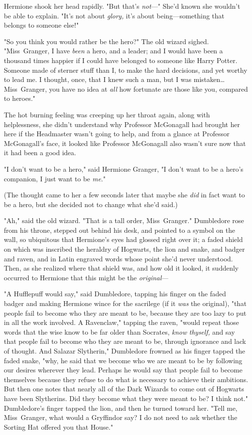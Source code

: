 Hermione shook her head rapidly. "But that's \emph{not}---" She'd known she
wouldn't be able to explain. "It's not about \emph{glory,} it's about
being---something that belongs to someone else!"

"So you think you would rather be the hero?" The old wizard sighed.
"Miss~Granger, I have \emph{been} a hero, and a leader; and I would have been a
thousand times happier if I could have belonged to someone like Harry Potter.
Someone made of sterner stuff than I, to make the hard decisions, and yet
worthy to lead me. I thought, once, that I knew such a man, but I was
mistaken{\ldots} Miss~Granger, you have no idea at \emph{all} how fortunate are
those like you, compared to heroes."

The hot burning feeling was creeping up her throat again, along with
helplessness, she didn't understand why Professor McGonagall had brought her
here if the Headmaster wasn't going to help, and from a glance at Professor
McGonagall's face, it looked like Professor McGonagall also wasn't sure now
that it had been a good idea.

"I don't want to be a hero," said Hermione Granger, "I don't want to be a
hero's companion, I just want to be \emph{me.}"

(The thought came to her a few seconds later that maybe she \emph{did} in fact
want to be a hero, but she decided not to change what she'd said.)

"Ah," said the old wizard. "That is a tall order, Miss~Granger." Dumbledore
rose from his throne, stepped out behind his desk, and pointed to a symbol on
the wall, so ubiquitous that Hermione's eyes had glossed right over it; a faded
shield on which was inscribed the heraldry of Hogwarts, the lion and snake, and
badger and raven, and in Latin engraved words whose point she'd never
understood. Then, as she realized where that shield was, and how old it looked,
it suddenly occurred to Hermione that this might be the \emph{original}---

"A Hufflepuff would say," said Dumbledore, tapping his finger on the faded
badger and making Hermione wince for the sacrilege (if it \emph{was} the
original), "that people fail to become who they are meant to be, because they
are too lazy to put in all the work involved. A Ravenclaw," tapping the raven,
"would repeat those words that the wise know to be far older than Socrates,
\emph{know thyself,} and say that people fail to become who they are meant to
be, through ignorance and lack of thought. And Salazar Slytherin," Dumbledore
frowned as his finger tapped the faded snake, "why, he said that we become who
we are meant to be by following our desires wherever they lead. Perhaps he
would say that people fail to become themselves because they refuse to do what
is necessary to achieve their ambitions. But then one notes that nearly all of
the Dark Wizards to come out of Hogwarts have been Slytherins. Did they become
what they were meant to be? I think not." Dumbledore's finger tapped the lion,
and then he turned toward her. "Tell me, Miss~Granger, what would a Gryffindor
say? I do not need to ask whether the Sorting Hat offered you that House."

